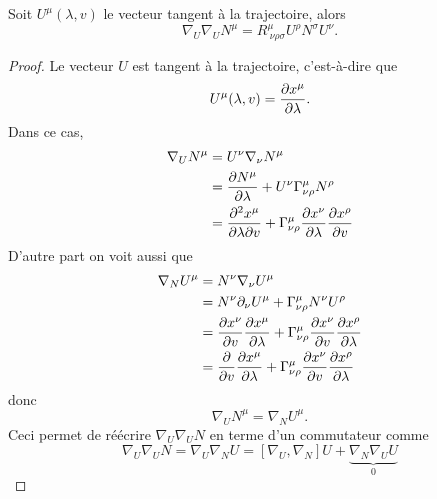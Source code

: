 \documentclass[a4paper,11pt]{report}
\begin{document}
            \begin{prop}\begin{leftbar}
                Soit $U^\mu(\lambda,v)$ le vecteur tangent à la trajectoire, alors
                \begin{equation}
                    \nabla_U\nabla_U N^\mu = R^\mu_{~\nu\rho\sigma}U^\rho N^\sigma U^\nu.
                \end{equation}
            \end{leftbar}\end{prop}
            
            \begin{proof}
                Le vecteur $U$ est tangent à la trajectoire, c'est-à-dire que
                \begin{equation}
                    U^\mu(\lambda,v) = \pdv{x^\mu}{\lambda}.
                \end{equation}
                Dans ce cas,
                \begin{align}
                    \nabla_U N^\mu &= U^\nu\nabla_\nu N^\mu\\
                    &= \pdv{N^\mu}{\lambda}+U^\nu\Gamma^\mu_{\nu\rho}N^\rho\\
                    &= \pdv{x^\mu}{\lambda}{v} + \Gamma^\mu_{\nu\rho}\pdv{x^\nu}{\lambda}\pdv{x^\rho}{v}
                \end{align}
                D'autre part on voit aussi que
                \begin{align}
                    \nabla_N U^\mu &= N^\nu \nabla_\nu U^\mu\\
                    &= N^\nu\partial_\nu U^\mu + \Gamma^\mu_{\nu\rho} N^\nu U^\rho\\
                    &= \pdv{x^\nu}{v}\pdv{x^\mu}{\lambda} + \Gamma^\mu_{\nu\rho}\pdv{x^\nu}{v}\pdv{x^\rho}{\lambda}\\
                    &= \pdv{}{v}\pdv{x^\mu}{\lambda} + \Gamma^\mu_{\nu\rho}\pdv{x^\nu}{v}\pdv{x^\rho}{\lambda}
                \end{align}
                donc
                \begin{equation}
                    \nabla_U N^\mu = \nabla_N U^\mu.
                \end{equation}
                Ceci permet de réécrire $\nabla_U\nabla_U N$ en terme d'un commutateur comme
                \begin{equation}
                    \nabla_U\nabla_U N = \nabla_U\nabla_N U = [\nabla_U,\nabla_N]U+\underbrace{\nabla_N\nabla_U U}_{0}

\end{equation}
\end{proof}
\end{document}
